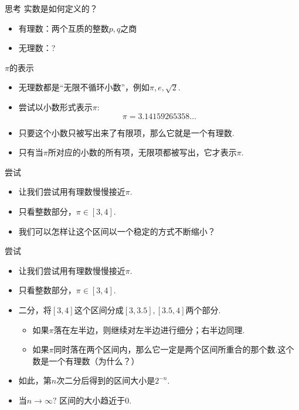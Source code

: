 \documentclass[]{beamer}
\begin{document}
\begin{frame}{思考}
    实数是如何定义的？

    \begin{itemize}
        \item 有理数：两个互质的整数$p,q$之商
        \item 无理数：\color{red}?
    \end{itemize}
\end{frame}

\begin{frame}{$\pi$的表示}
    \begin{itemize}
        \item 无理数都是“无限不循环小数”，例如$\pi,e,\sqrt2$.
        \item 尝试以小数形式表示$\pi$:
        \[
        \pi = 3.14159265358\ldots
        \]
        \item 只要这个小数只被写出来了有限项，那么它就是一个有理数.
        \item 只有当$\pi$所对应的小数的所有项，无限项都被写出，它才表示$\pi$.
    \end{itemize}
\end{frame}

\begin{frame}{尝试}
    \begin{itemize}
        \item 让我们尝试用有理数慢慢接近$\pi$.
        \item 只看整数部分，$\pi\in [3,4]$.
        \item 我们可以怎样让这个区间以一个稳定的方式不断缩小？
    \end{itemize}
\end{frame}

\begin{frame}{尝试}
    \begin{itemize}
        \item 让我们尝试用有理数慢慢接近$\pi$.
        \item 只看整数部分，$\pi\in [3,4]$.
        \item 二分，将$[3,4]$这个区间分成$[3,3.5],[3.5,4]$两个部分.
        \begin{itemize}
            \item 如果$\pi$落在左半边，则继续对左半边进行细分；右半边同理.
            \item 如果$\pi$同时落在两个区间内，那么它一定是两个区间所重合的那个数.这个数是一个有理数（为什么？）
        \end{itemize}
        \item 如此，第$n$次二分后得到的区间大小是$2^{-n}$.
        \item 当$n\rightarrow\infty ?$ 区间的大小趋近于$0$.
    \end{itemize}
\end{frame}
\end{document}
